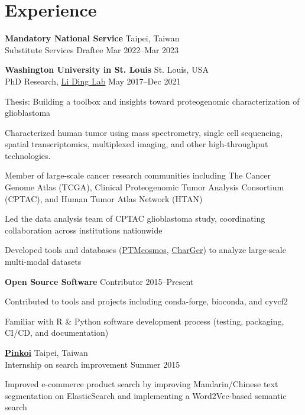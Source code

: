 \section{Experience}
\begin{entrylist}

\item \textbf{Mandatory National Service} \hfill Taipei, Taiwan\\
Substitute Services Draftee \hfill
Mar 2022--Mar 2023

\item \textbf{Washington University in St. Louis} \hfill St. Louis, USA\\
PhD Research, \href{https://dinglab.wustl.edu/}{Li Ding Lab} \hfill
May 2017--Dec 2021
\begin{detaillist}
    \item Thesis: Building a toolbox and insights toward proteogenomic characterization of glioblastoma
    \item Characterized human tumor using mass spectrometry, single cell sequencing, spatial transcriptomics, multiplexed imaging, and other high-throughput technologies.
    \item Member of large-scale cancer research communities including The Cancer Genome Atlas (TCGA), Clinical Proteogenomic Tumor Analysis Consortium (CPTAC), and Human Tumor Atlas Network (HTAN)
    \item Led the data analysis team of CPTAC glioblastoma study, coordinating collaboration across institutions nationwide
    \item Developed tools and databases (\href{https://ptmcosmos.wustl.edu/}{PTMcosmos}, \href{https://github.com/ding-lab/CharGer}{CharGer}) to analyze large-scale multi-modal datasets
\end{detaillist}

\item \textbf{Open Source Software}
Contributor \hfill 2015--Present
\begin{detaillist}
    \item Contributed to tools and projects including conda-forge, bioconda, and cyvcf2
    \item Familiar with R \& Python software development process (testing, packaging, CI/CD, and documentation)
\end{detaillist}

\item \href{http://pinkoi.com}{\textbf{Pinkoi}} \hfill Taipei, Taiwan\\
Internship on search improvement \hfill
Summer 2015
\begin{detaillist}
    \item Improved e-commerce product search by improving Mandarin/Chinese text segmentation on ElasticSearch and implementing a Word2Vec-based semantic search
\end{detaillist}


\end{entrylist}
